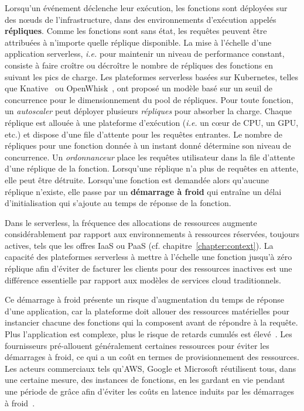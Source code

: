 Lorsqu'un événement déclenche leur exécution, les fonctions sont déployées sur des nœuds de l'infrastructure, dans des environnements d'exécution appelés \textbf{répliques}. Comme les fonctions sont sans état, les requêtes peuvent être attribuées à n'importe quelle réplique disponible. La mise à l'échelle d'une application serverless, \textit{i.e.} pour maintenir un niveau de performance constant, consiste à faire croître ou décroître le nombre de répliques des fonctions en suivant les pics de charge. Les plateformes serverless basées sur Kubernetes, telles que Knative~\cite{knative} ou OpenWhisk~\cite{openwhisk}, ont proposé un modèle basé sur un seuil de concurrence pour le dimensionnement du pool de répliques. Pour toute fonction, un \textit{autoscaler} peut déployer plusieurs \textit{répliques} pour absorber la charge. Chaque réplique est allouée à une plateforme d'exécution (\textit{i.e.} un cœur de CPU, un GPU, etc.) et dispose d'une file d'attente pour les requêtes entrantes. Le nombre de répliques pour une fonction donnée à un instant donné détermine son niveau de concurrence. Un \textit{ordonnanceur} place les requêtes utilisateur dans la file d'attente d'une réplique de la fonction. Lorsqu'une réplique n'a plus de requêtes en attente, elle peut être détruite. Lorsqu'une fonction est demandée alors qu'aucune réplique n'existe, elle passe par un \textbf{démarrage à froid} qui entraîne un délai d'initialisation qui s'ajoute au temps de réponse de la fonction.

Dans le serverless, la fréquence des allocations de ressources augmente considérablement par rapport aux environnements à ressources réservées, toujours actives, tels que les offres IaaS ou PaaS (cf. chapitre~\ref{chapter:context}). La capacité des plateformes serverless à mettre à l'échelle une fonction jusqu'à zéro réplique afin d'éviter de facturer les clients pour des ressources inactives est une différence essentielle par rapport aux modèles de services cloud traditionnels.

Ce démarrage à froid présente un risque d'augmentation du temps de réponse d'une application, car la plateforme doit allouer des ressources matérielles pour instancier chacune des fonctions qui la composent avant de répondre à la requête. Plus l'application est complexe, plus le risque de retards cumulés est élevé~\cite{mohanAgileColdStartsa}. Les fournisseurs pré-allouent généralement certaines ressources pour éviter les démarrages à froid, ce qui a un coût en termes de provisionnement des ressources. Les acteurs commerciaux tels qu'AWS, Google et Microsoft réutilisent tous, dans une certaine mesure, des instances de fonctions, en les gardant en vie pendant une période de grâce afin d'éviter les coûts en latence induits par les démarrages à froid~\cite{vahidiniaColdStartServerless2020}.

